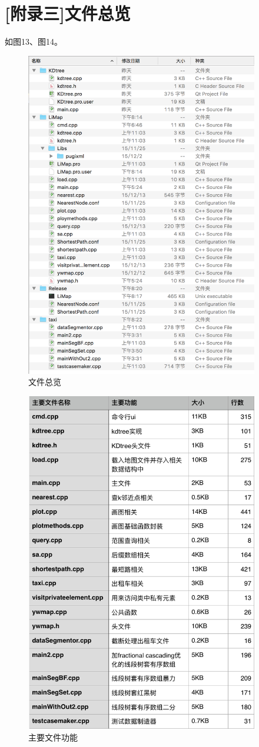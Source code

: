 \documentclass[10pt]{scrartcl}
\begin{document}
\section{[附录三]文件总览}
如图13、图14。
\begin{figure}[htbp] 
\centering\includegraphics[width=4in]{文件一览} 
\caption{文件总览}\label{fig:9}
\end{figure} 

\begin{figure}[htbp] 
\centering\includegraphics[width=4in]{表格文件总览} 
\caption{主要文件功能}\label{fig:10}
\end{figure} 
\end{document}
